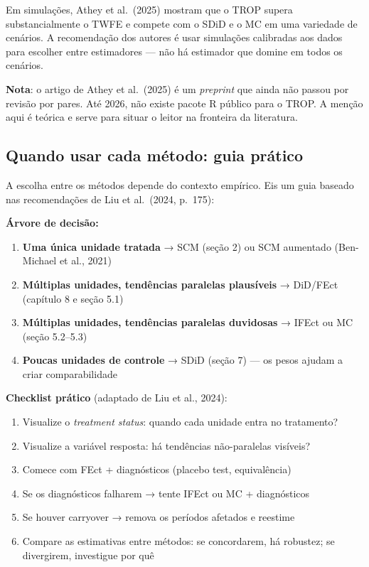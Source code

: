 \documentclass[
]{article}
\providecommand{\tightlist}{%
  \setlength{\itemsep}{0pt}\setlength{\parskip}{0pt}}
\begin{document}
Em simulações, Athey et al.~(2025) mostram que o TROP supera substancialmente o TWFE e compete com o SDiD e o MC em uma variedade de cenários. A recomendação dos autores é usar simulações calibradas aos dados para escolher entre estimadores --- não há estimador que domine em todos os cenários.

\textbf{Nota}: o artigo de Athey et al.~(2025) é um \emph{preprint} que ainda não passou por revisão por pares. Até 2026, não existe pacote R público para o TROP. A menção aqui é teórica e serve para situar o leitor na fronteira da literatura.

\subsection{Quando usar cada método: guia prático}\label{quando-usar-cada-muxe9todo-guia-pruxe1tico}

A escolha entre os métodos depende do contexto empírico. Eis um guia baseado nas recomendações de Liu et al.~(2024, p.~175):

\textbf{Árvore de decisão:}

\begin{enumerate}
\def\labelenumi{\arabic{enumi}.}
\tightlist
\item
  \textbf{Uma única unidade tratada} → SCM (seção 2) ou SCM aumentado (Ben-Michael et al., 2021)
\item
  \textbf{Múltiplas unidades, tendências paralelas plausíveis} → DiD/FEct (capítulo 8 e seção 5.1)
\item
  \textbf{Múltiplas unidades, tendências paralelas duvidosas} → IFEct ou MC (seção 5.2--5.3)
\item
  \textbf{Poucas unidades de controle} → SDiD (seção 7) --- os pesos ajudam a criar comparabilidade
\end{enumerate}

\textbf{Checklist prático} (adaptado de Liu et al., 2024):

\begin{enumerate}
\def\labelenumi{\arabic{enumi}.}
\tightlist
\item
  Visualize o \emph{treatment status}: quando cada unidade entra no tratamento?
\item
  Visualize a variável resposta: há tendências não-paralelas visíveis?
\item
  Comece com FEct + diagnósticos (placebo test, equivalência)
\item
  Se os diagnósticos falharem → tente IFEct ou MC + diagnósticos
\item
  Se houver carryover → remova os períodos afetados e reestime
\item
  Compare as estimativas entre métodos: se concordarem, há robustez; se divergirem, investigue por quê
\end{enumerate}
\end{document}
